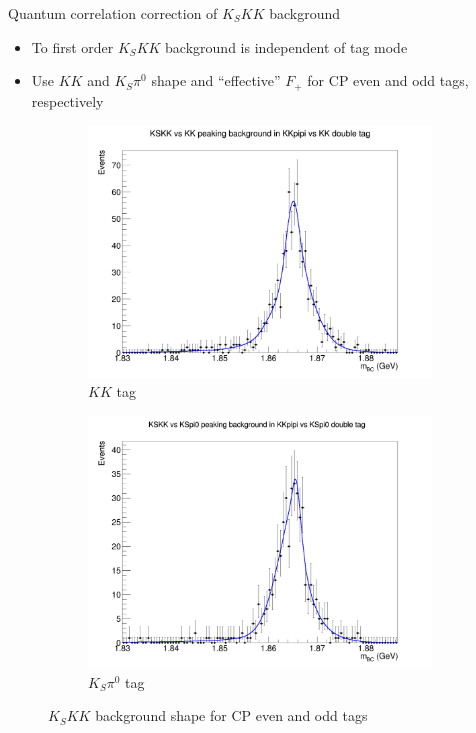 \documentclass{beamer}
\begin{document}
\begin{frame}{Quantum correlation correction of $K_SKK$ background}
  \begin{itemize}
    \setlength\itemsep{1.0em}
    \item{To first order $K_SKK$ background is independent of tag mode}
    \item{Use $KK$ and $K_S\pi^0$ shape and ``effective'' $F_+$ for CP even and odd tags, respectively}
  \end{itemize}
  \begin{figure}
    \centering
    \begin{subfigure}{0.49\textwidth}
      \centering
      \includegraphics[width=\textwidth]{Plots/KSKK_to_KKpipi_vs_KK_DoubleTag_FitPlot.png}
      \caption{$KK$ tag}
    \end{subfigure}%
    \begin{subfigure}{0.49\textwidth}
      \centering
      \includegraphics[width=\textwidth]{Plots/KSKK_to_KKpipi_vs_KSpi0_DoubleTag_FitPlot.png}
      \caption{$K_S\pi^0$ tag}
    \end{subfigure}
    \caption{$K_SKK$ background shape for CP even and odd tags}
  \end{figure}
\end{frame}
\end{document}
